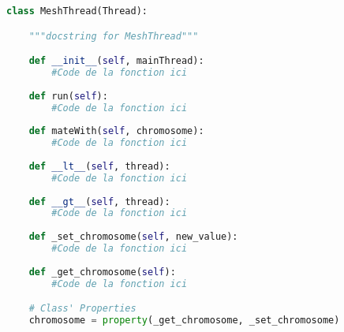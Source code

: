 		\begin{lstlisting}[language=python]
class MeshThread(Thread):

	"""docstring for MeshThread"""

	def __init__(self, mainThread):
		#Code de la fonction ici	
	
	def run(self):
		#Code de la fonction ici	
	
	def mateWith(self, chromosome):
		#Code de la fonction ici	
	
	def __lt__(self, thread):
		#Code de la fonction ici	
	
	def __gt__(self, thread):
		#Code de la fonction ici	
	
	def _set_chromosome(self, new_value):	
		#Code de la fonction ici	
	
	def _get_chromosome(self):
		#Code de la fonction ici	

	# Class' Properties
	chromosome = property(_get_chromosome, _set_chromosome)	
    \end{lstlisting}
